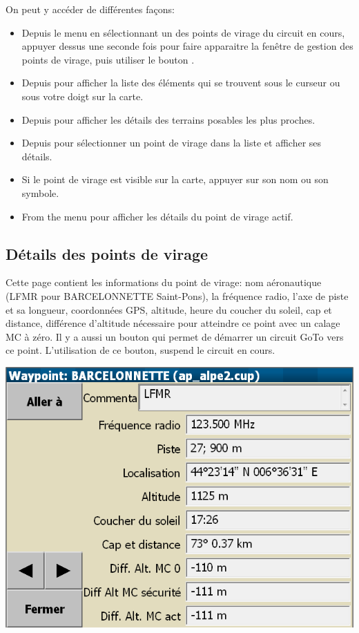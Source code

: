 On peut y accéder de différentes façons:
\begin{itemize}
\item
Depuis le menu \blink{}\blink{} en sélectionnant un des points de virage du circuit en cours, appuyer dessus une seconde fois pour faire apparaitre la fenêtre de gestion des points de virage, puis utiliser le bouton  .

\item
Depuis \blink{} pour afficher la liste des éléments qui se trouvent sous le curseur ou sous votre doigt sur la carte.

\item
Depuis \blink{} pour afficher les détails des terrains posables les plus proches.

\item
Depuis \blink{} pour sélectionner un point de virage dans la liste et afficher ses détails.

\item
Si le point de virage est visible sur la carte, appuyer sur son nom ou son symbole.

\item 
From the menu \blink{} pour afficher les détails du point de virage actif.
\end{itemize}



\subsection*{Détails des points de virage}\label{sec:waypointdetails}
Cette page contient les informations du point de virage: nom aéronautique (LFMR pour BARCELONNETTE Saint-Pons), la fréquence radio, l'axe de piste et sa longueur, coordonnées GPS, altitude, heure du coucher du soleil, cap et distance, différence d'altitude nécessaire pour atteindre ce point avec un calage MC à zéro. Il y a aussi un bouton  qui permet de démarrer un circuit GoTo vers ce point. L'utilisation de ce bouton, suspend le circuit en cours.

\begin{center}
\includegraphics[angle=0,width=0.8\linewidth,keepaspectratio='true']{figures/dialog-waypointdetails0.png}
\end{center}

